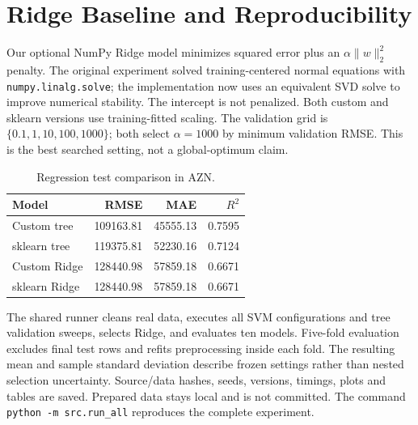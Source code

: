 \section{Ridge Baseline and Reproducibility}
Our optional NumPy Ridge model minimizes squared error plus an $\alpha\lVert w\rVert_2^2$ penalty. The original experiment solved training-centered normal equations with \texttt{numpy.linalg.solve}; the implementation now uses an equivalent SVD solve to improve numerical stability. The intercept is not penalized. Both custom and sklearn versions use training-fitted scaling. The validation grid is $\{0.1,1,10,100,1000\}$; both select $\alpha=1000$ by minimum validation RMSE. This is the best searched setting, not a global-optimum claim.

\begin{table}[ht]
\centering\scriptsize
\caption{Regression test comparison in AZN.}
\begin{tabular}{lrrr}
\toprule
Model & RMSE & MAE & $R^2$ \\
\midrule
Custom tree & 109163.81 & 45555.13 & 0.7595 \\
sklearn tree & 119375.81 & 52230.16 & 0.7124 \\
Custom Ridge & 128440.98 & 57859.18 & 0.6671 \\
sklearn Ridge & 128440.98 & 57859.18 & 0.6671 \\
\bottomrule
\end{tabular}
\end{table}
The shared runner cleans real data, executes all SVM configurations and tree validation sweeps, selects Ridge, and evaluates ten models. Five-fold evaluation excludes final test rows and refits preprocessing inside each fold. The resulting mean and sample standard deviation describe frozen settings rather than nested selection uncertainty. Source/data hashes, seeds, versions, timings, plots and tables are saved. Prepared data stays local and is not committed. The command \texttt{python -m src.run\_all} reproduces the complete experiment.
